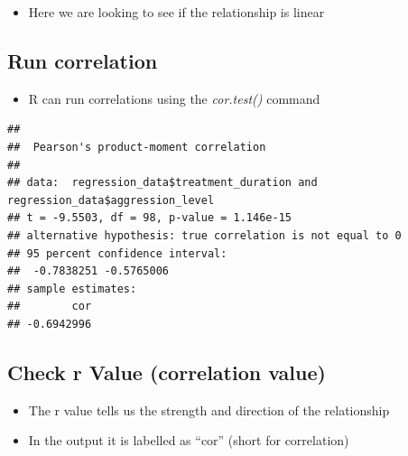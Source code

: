\documentclass[
]{book}
\newenvironment{Shaded}{\begin{snugshade}}{\end{snugshade}}
\newcommand{\KeywordTok}[1]{\textcolor[rgb]{0.13,0.29,0.53}{\textbf{#1}}}
\newcommand{\NormalTok}[1]{#1}
\newcommand{\OperatorTok}[1]{\textcolor[rgb]{0.81,0.36,0.00}{\textbf{#1}}}
\providecommand{\tightlist}{%
  \setlength{\itemsep}{0pt}\setlength{\parskip}{0pt}}
\begin{document}
\begin{itemize}
\tightlist
\item
  Here we are looking to see if the relationship is linear
\end{itemize}

\hypertarget{run-correlation}{%
\subsection{Run correlation}\label{run-correlation}}

\begin{itemize}
\tightlist
\item
  R can run correlations using the \emph{cor.test()} command
\end{itemize}

\begin{Shaded}
\end{Shaded}

\begin{verbatim}
## 
##  Pearson's product-moment correlation
## 
## data:  regression_data$treatment_duration and regression_data$aggression_level
## t = -9.5503, df = 98, p-value = 1.146e-15
## alternative hypothesis: true correlation is not equal to 0
## 95 percent confidence interval:
##  -0.7838251 -0.5765006
## sample estimates:
##        cor 
## -0.6942996
\end{verbatim}

\hypertarget{check-r-value-correlation-value}{%
\subsection{Check r Value (correlation value)}\label{check-r-value-correlation-value}}

\begin{itemize}
\tightlist
\item
  The r value tells us the strength and direction of the relationship
\item
  In the output it is labelled as ``cor'' (short for correlation)
\end{itemize}

\begin{Shaded}
\end{Shaded}
\end{document}
